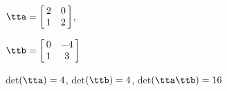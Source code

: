 {$\tta = \left[\hskip -3pt \begin{array}{cc} 2&0\\  1&2\end {array}\hskip -3pt \right] $, 

$\ttb = \left[\hskip -3pt \begin{array}{cc} 0&-4\\  1&3\end{array}\hskip -3pt \right] $}
{det$(\tta)=4$, det$(\ttb)=4$, det$(\tta\ttb)=16$}






  

